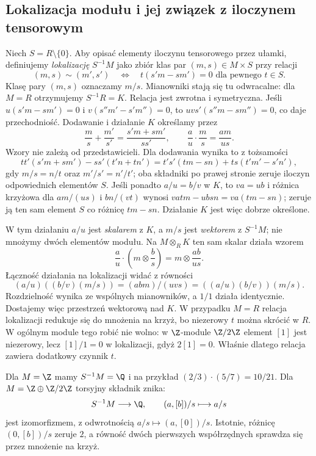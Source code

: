 \subsection*{Lokalizacja modułu i jej związek z iloczynem tensorowym}

Niech $S=R\setminus\{0\}$. Aby opisać elementy iloczynu tensorowego przez
ułamki, definiujemy \emph{lokalizację} $S^{-1}M$ jako zbiór klas
par $(m,s)\in M\times S$ przy relacji
\[
(m,s)\sim(m',s')
\quad\Longleftrightarrow\quad
t(s'm-sm')=0\text{ dla pewnego }t\in S.
\]
Klasę pary $(m,s)$ oznaczamy $m/s$. Mianowniki stają się tu
odwracalne: dla $M=R$ otrzymujemy $S^{-1}R=K$.
Relacja jest zwrotna i symetryczna. Jeśli
$u(s'm-sm')=0$ i $v(s''m'-s'm'')=0$, to
$uvs'(s''m-sm'')=0$, co daje przechodniość.
Dodawanie i działanie $K$ określamy przez
\[
\frac{m}{s}+\frac{m'}{s'}=\frac{s'm+sm'}{ss'},
\qquad
\frac{a}{u}\cdot\frac{m}{s}=\frac{am}{us}.
\]
Wzory nie zależą od przedstawicieli. Dla dodawania wynika to
z tożsamości
\[
tt'(s'm+sm')-ss'(t'n+tn')
=t's'(tm-sn)+ts(t'm'-s'n'),
\]
gdy $m/s=n/t$ oraz $m'/s'=n'/t'$; oba składniki po prawej
stronie zeruje iloczyn odpowiednich elementów $S$.
Jeśli ponadto $a/u=b/v$ w $K$, to $va=ub$ i różnica
krzyżowa dla $am/(us)$ i $bn/(vt)$ wynosi
$v a t m-u b s n=v a(t m-s n)$; zeruje ją ten sam element $S$
co różnicę $t m-s n$. Działanie $K$ jest więc dobrze określone.

W tym działaniu $a/u$ jest \emph{skalarem} z $K$, a $m/s$ jest
\emph{wektorem} z $S^{-1}M$; nie mnożymy dwóch elementów modułu.
Na $M\otimes_R K$ ten sam skalar działa wzorem
\[
 \frac au\cdot\left(m\otimes\frac bs\right)
 =m\otimes\frac{ab}{us}.
\]
Łączność działania na lokalizacji widać z równości
\[
 (a/u)((b/v)(m/s))=(abm)/(uvs)=((a/u)(b/v))(m/s).
\]
Rozdzielność wynika ze wspólnych mianowników, a $1/1$ działa
identycznie. Dostajemy więc przestrzeń wektorową nad $K$.
W przypadku $M=R$ relacja lokalizacji redukuje się do mnożenia
na krzyż, bo niezerowy $t$ można skrócić w $R$.
W ogólnym module tego robić nie wolno: w $\Z$-module $\Z/2\Z$
element $[1]$ jest niezerowy, lecz $[1]/1=0$ w lokalizacji,
gdyż $2[1]=0$. Właśnie dlatego relacja zawiera dodatkowy czynnik $t$.

\begin{przyklad}
Dla $M=\Z$ mamy $S^{-1}M=\Q$ i na przykład
$(2/3)\cdot(5/7)=10/21$.
Dla $M=\Z\oplus\Z/2\Z$ torsyjny składnik znika:
\[
 S^{-1}M\longrightarrow\Q,\qquad (a,[b])/s\longmapsto a/s
\]
jest izomorfizmem, z odwrotnością $a/s\mapsto(a,[0])/s$.
Istotnie, różnicę $(0,[b])/s$ zeruje $2$, a równość dwóch
pierwszych współrzędnych sprawdza się przez mnożenie na krzyż.
\end{przyklad}

